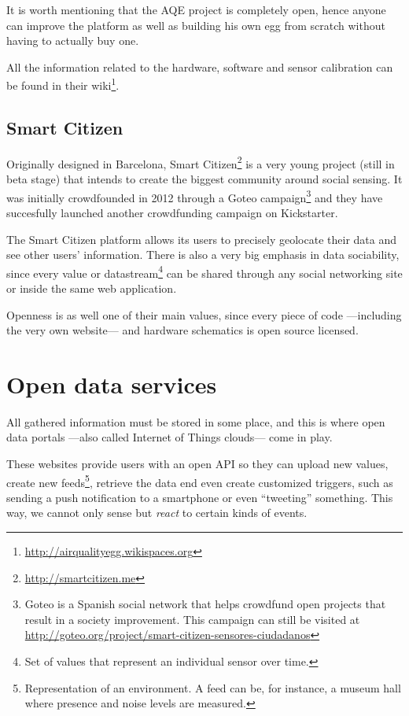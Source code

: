It is worth mentioning that the AQE project is completely open, hence anyone can improve the platform as well as building his own egg from scratch without having to actually buy one.

All the information related to the hardware, software and sensor calibration can be found in their wiki\footnote{\url{http://airqualityegg.wikispaces.org}}.

\subsection{Smart Citizen}

Originally designed in Barcelona, Smart Citizen\footnote{\url{http://smartcitizen.me}} is a very young project (still in beta stage) that intends to create the biggest community around social sensing. It was initially crowdfounded in 2012 through a Goteo campaign\footnote{Goteo is a Spanish social network that helps crowdfund open projects that result in a society improvement. This campaign can still be visited at \url{http://goteo.org/project/smart-citizen-sensores-ciudadanos}} and they have succesfully launched another crowdfunding campaign on Kickstarter.

The Smart Citizen platform allows its users to precisely geolocate their data and see other users' information. There is also a very big emphasis in data sociability, since every value or datastream\footnote{Set of values that represent an individual sensor over time.} can be shared through any social networking site or inside the same web application.

Openness is as well one of their main values, since every piece of code ---including the very own website--- and hardware schematics is open source licensed.


\section{Open data services}

All gathered information must be stored in some place, and this is where open data portals ---also called Internet of Things clouds--- come in play.

These websites provide users with an open API so they can upload new values, create new feeds\footnote{Representation of an environment. A feed can be, for instance, a museum hall where presence and noise levels are measured.}, retrieve the data end even create customized triggers, such as sending a push notification to a smartphone or even ``tweeting'' something. This way, we cannot only sense but \emph{react} to certain kinds of events.

